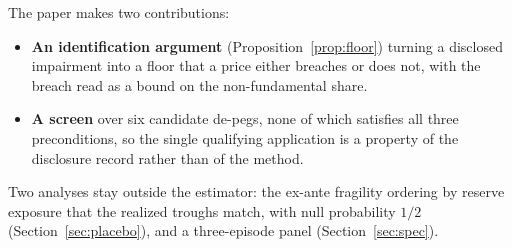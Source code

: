 The paper makes two contributions:
\begin{itemize}
\item \textbf{An identification argument} (Proposition~\ref{prop:floor}) turning a
  disclosed impairment into a floor that a price either breaches or does not, with the
  breach read as a bound on the non-fundamental share.
\item \textbf{A screen} over six candidate de-pegs, none of which satisfies all three
  preconditions, so the single qualifying application is a property of the disclosure
  record rather than of the method.
\end{itemize}
Two analyses stay outside the estimator: the ex-ante fragility
ordering by reserve exposure that the realized troughs match, with null probability $1/2$
(Section~\ref{sec:placebo}), and a three-episode panel (Section~\ref{sec:spec}).
